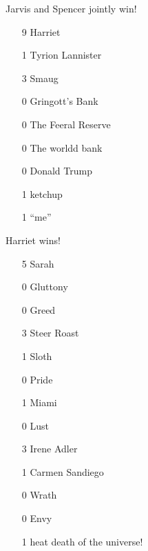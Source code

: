 \documentclass[10pt]{article}
\begin{document}
Jarvis and Spencer jointly win!



\begin{itemize}

\item[9] Harriet

\item[1] Tyrion Lannister

\item[3] Smaug

\item[0] Gringott's Bank

\item[0] The Feeral Reserve

\item[0] The worldd bank

\item[0] Donald Trump

\item[1] ketchup

\item[1] ``me''

\end{itemize}



Harriet wins!



\begin{itemize}

\item[5] Sarah

\item[0] Gluttony

\item[0] Greed

\item[3] Steer Roast

\item[1] Sloth

\item[0] Pride

\item[1] Miami

\item[0] Lust

\item[3] Irene Adler

\item[1] Carmen Sandiego

\item[0] Wrath

\item[0] Envy

\item[1] heat death of the universe!

\end{itemize}
\end{document}
